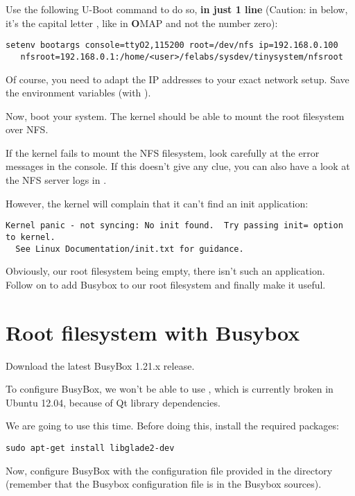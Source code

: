 Use the following U-Boot command to do so, {\bf in just 1 line}
(Caution: in  below, it's the capital letter , like in
{\bf O}MAP and not the number zero):

\begin{verbatim}
setenv bootargs console=ttyO2,115200 root=/dev/nfs ip=192.168.0.100
   nfsroot=192.168.0.1:/home/<user>/felabs/sysdev/tinysystem/nfsroot
\end{verbatim}

Of course, you need to adapt the IP addresses to your exact network
setup. Save the environment variables (with ).

Now, boot your system. The kernel should be able to mount the root
filesystem over NFS.

If the kernel fails to mount the NFS filesystem, look carefully at the
error messages in the console. If this doesn't give any clue, you can
also have a look at the NFS server logs in .

However, the kernel will complain that it can't find an init
application:

\footnotesize
\begin{verbatim}
Kernel panic - not syncing: No init found.  Try passing init= option to kernel.
  See Linux Documentation/init.txt for guidance.
\end{verbatim}
\normalsize

Obviously, our root filesystem being empty, there isn't such an
application. Follow on to add Busybox to our root filesystem and
finally make it useful.

\section{Root filesystem with Busybox}

Download the latest BusyBox 1.21.x release.

To configure BusyBox, we won't be able to use ,
which is currently broken in Ubuntu 12.04, because of Qt library
dependencies.

We are going to use  this time. Before doing this,
install the required packages:

\begin{verbatim}
sudo apt-get install libglade2-dev
\end{verbatim}

Now, configure BusyBox with the configuration file provided in the
 directory (remember that the Busybox configuration file
is  in the Busybox sources).

